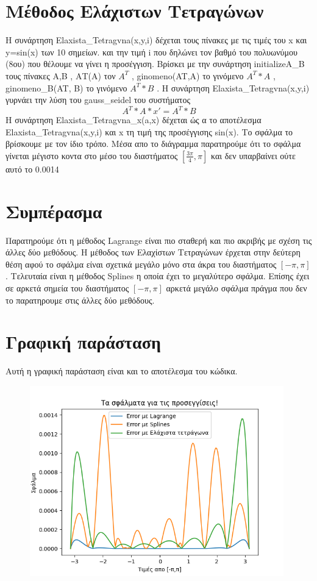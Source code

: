 \documentclass{article}
\begin{document}
    \section{Μέθοδος Ελάχιστων Τετραγώνων}
    Η συνάρτηση Elaxista\_Tetragvna(x,y,i) δέχεται τους πίνακες με τις 
    τιμές του x και y=sin(x) των 10 σημείων.
    και την τιμή i που δηλώνει τον βαθμό του πολυωνύμου 
    (8ου) που θέλουμε να γίνει η προσέγγιση. Βρίσκει με την συνάρτηση initializeA\_B τους 
    πίνακες Α,Β , ΑΤ(Α) τον $A^{T}$ , ginomeno(AT,A) το
    γινόμενο $A^{T} * A$ , ginomeno\_B(AT, B) το γινόμενο
    $ A^{T} * B$ .
    Η συνάρτηση Elaxista\_Tetragvna(x,y,i) γυρνάει την λύση του gauss\_seidel του συστήματος 
    \begin{equation*}
    A^{T} * A * x' = A^{T} * B
    \end{equation*}
    Η συνάρτηση Elaxista\_Tetragvna\_x(a,x) δέχεται ώς α το 
    αποτέλεσμα  Elaxista\_Tetragvna(x,y,i)
    και x τη τιμή της προσέγγισης sin(x). 
    Το σφάλμα το βρίσκουμε με τον ίδιο τρόπο.
    Μέσα απο το διάγραμμα παρατηρούμε ότι το σφάλμα γίνεται 
    μέγιστο κοντα στο μέσο του διαστήματος $[\frac{3\pi}{4}, \pi]$ 
    και δεν υπαρβαίνει ούτε αυτό το 0.0014
    
    
    \section{Συμπέρασμα}
    Παρατηρούμε ότι η μέθοδος Lagrange είναι πιο σταθερή και πιο ακριβής με σχέση 
    τις άλλες δύο μεθόδους. Η μέθοδος των Ελαχίστων Τετραγώνων έρχεται στην 
    δεύτερη θέση αφού το σφάλμα είναι σχετικά μεγάλο μόνο στα άκρα του διαστήματος
    $[-\pi,\pi]$.  Τελευταία είναι η μέθοδος Splines η οποία έχει το μεγαλύτερο σφάλμα. Επίσης έχει σε αρκετά σημεία 
    του διαστήματος $[-\pi,\pi]$ αρκετά μεγάλο σφάλμα πράγμα που δεν το παρατηρουμε στις άλλες δύο μεθόδους.
    
    \section{Γραφική παράσταση}
    Αυτή η γραφική παράσταση είναι και το αποτέλεσμα του κώδικα.
    \begin{figure}[h]
    \includegraphics[width=11cm]{Errors.png}
    \end{figure}
    
    
\end{document}
